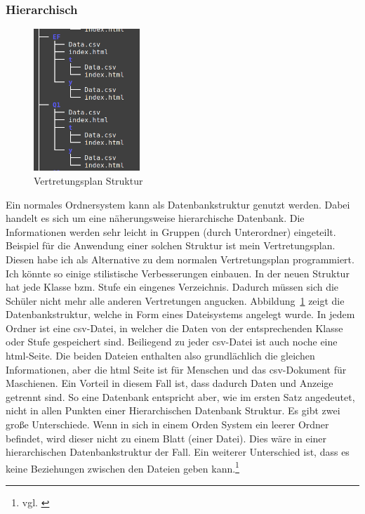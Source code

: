 \documentclass[a4paper, 12pt]{article}
\theoremstyle{plain}
\theoremstyle{definition}
\begin{document}
	\subsubsection{Hierarchisch}
	\label{sec:hierdb}
	
	\begin{figure}
	\vspace{-13pt}
	\includegraphics[width=4cm]{vertretungTree.png}
	\vspace{-30pt}
	\caption{Vertre\-tungsplan Struktur}\label{fig:verTree}
	\end{figure}
	Ein normales Ordnersystem kann als Datenbankstruktur genutzt werden. Dabei handelt es sich um eine näherungsweise hierarchische Datenbank. Die Informationen werden sehr leicht in Gruppen (durch Unterordner) eingeteilt. Beispiel für die Anwendung einer solchen Struktur ist mein Vertretungsplan. Diesen habe ich als Alternative zu dem normalen Vertretungsplan programmiert. Ich könnte so einige stilistische Verbesserungen einbauen. In der neuen Struktur hat jede Klasse bzm. Stufe ein eingenes Verzeichnis. Dadurch müssen sich die Schüler nicht mehr alle anderen Vertretungen angucken.  Abbildung~\ref{fig:verTree} zeigt die Datenbankstruktur, welche in Form eines Dateisystems angelegt wurde. In jedem Ordner ist eine csv-Datei, in welcher die Daten von der entsprechenden Klasse oder Stufe gespeichert sind. Beiliegend zu jeder csv-Datei ist auch noche eine html-Seite. Die beiden Dateien enthalten also grundlächlich die gleichen Informationen, aber die html Seite ist für Menschen und das csv-Dokument für Maschienen. Ein Vorteil in diesem Fall ist, dass dadurch Daten und Anzeige getrennt sind. So eine Datenbank entspricht aber, wie im ersten Satz angedeutet, nicht in allen Punkten einer Hierarchischen Datenbank Struktur. Es gibt zwei große Unterschiede. Wenn in sich in einem Orden System ein leerer Ordner befindet, wird dieser nicht zu einem Blatt (einer Datei). Dies wäre in einer hierarchischen Datenbankstruktur der Fall. Ein weiterer Unterschied ist, dass es keine Beziehungen zwischen den Dateien geben kann.\footnote{vgl. \cite{hierDbWiki}}\\
\end{document}

